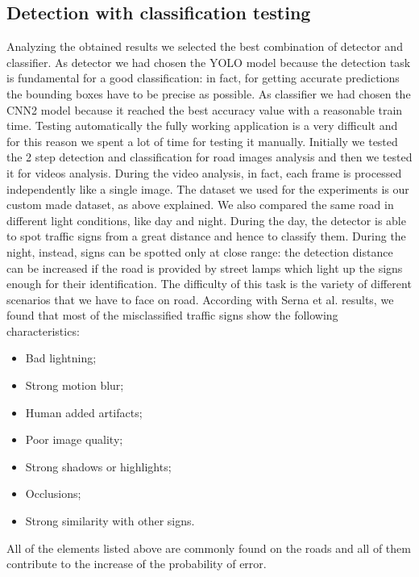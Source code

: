 \subsection{Detection with classification testing}
Analyzing the obtained results we selected the best combination of detector and classifier. As detector we had chosen the YOLO model because the detection task is fundamental for a good classification: in fact, for getting accurate predictions the bounding boxes have to be precise as possible. As classifier we had chosen the CNN2 model because it reached the best accuracy value with a reasonable train time. Testing automatically the fully working application is a very difficult and for this reason we spent a lot of time for testing it manually. Initially we tested the 2 step detection and classification for road images analysis and then we tested it for videos analysis. During the video analysis, in fact, each frame is processed independently like a single image. The dataset we used for the experiments is our custom made dataset, as above explained. We also compared the same road in different light conditions, like day and night. During the day, the detector is able to spot traffic signs from a great distance and hence to classify them. During the night, instead, signs can be spotted only at close range: the detection distance can be increased if the road is provided by street lamps which light up the signs enough for their identification. 
The difficulty of this task is the variety of different scenarios that we have to face on road. According with Serna et al. \cite{gamezPaper} results, we found that most of the misclassified traffic signs show the following characteristics:
\begin{itemize}[noitemsep,topsep=0pt]
	\item Bad lightning;
	\item Strong motion blur;
	\item Human added artifacts;
	\item Poor image quality;
	\item Strong shadows or highlights;
	\item Occlusions;
	\item Strong similarity with other signs.
\end{itemize} 
All of the elements listed above are commonly found on the roads and all of them contribute to the increase of the probability of error.